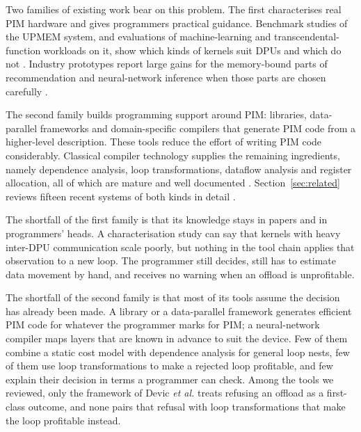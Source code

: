 \documentclass{ieeeaccess}
\begin{document}
Two families of existing work bear on this problem. The first characterises real PIM hardware and gives programmers practical guidance. Benchmark studies of the UPMEM system, and evaluations of machine-learning and transcendental-function workloads on it, show which kinds of kernels suit DPUs and which do not \cite{gomezluna2023ml, item2023transpimlib}. Industry prototypes report large gains for the memory-bound parts of recommendation and neural-network inference when those parts are chosen carefully \cite{ke2020recnmp, kwon2021fimdram}.

The second family builds programming support around PIM: libraries, data-parallel frameworks and domain-specific compilers that generate PIM code from a higher-level description. These tools reduce the effort of writing PIM code considerably. Classical compiler technology supplies the remaining ingredients, namely dependence analysis, loop transformations, dataflow analysis and register allocation, all of which are mature and well documented \cite{cooper2022engineering}. Section~\ref{sec:related} reviews fifteen recent systems of both kinds in detail \cite{gomezluna2022prim, devic2022topim, khan2023cinm, chen2023simplepim, oliveira2023dappa, shin2023pimflow, oliveira2021damov, giannoula2022sparsep, boroumand2019conda, wang2023infinity, oliveira2024mimdram, hajinazar2021simdram, lee2021hbmpim, hyun2024pathfinding, sun2023pimcomp}.

The shortfall of the first family is that its knowledge stays in papers and in programmers' heads. A characterisation study can say that kernels with heavy inter-DPU communication scale poorly, but nothing in the tool chain applies that observation to a new loop. The programmer still decides, still has to estimate data movement by hand, and receives no warning when an offload is unprofitable.

The shortfall of the second family is that most of its tools assume the decision has already been made. A library or a data-parallel framework generates efficient PIM code for whatever the programmer marks for PIM; a neural-network compiler maps layers that are known in advance to suit the device. Few of them combine a static cost model with dependence analysis for general loop nests, few of them use loop transformations to make a rejected loop profitable, and few explain their decision in terms a programmer can check. Among the tools we reviewed, only the framework of Devic \emph{et al.} treats refusing an offload as a first-class outcome, and none pairs that refusal with loop transformations that make the loop profitable instead.
\end{document}
